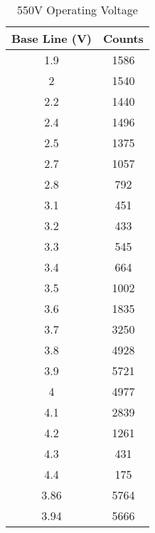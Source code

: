 \begin{table}[]
	\centering
	\begin{tabular}{|c|c|}
	\hline
	\textbf{Base Line (V)} & \textbf{Counts} \\ \hline
	1.9 & 1586 \\ \hline
	2 & 1540 \\ \hline
	2.2 & 1440 \\ \hline
	2.4 & 1496 \\ \hline
	2.5 & 1375 \\ \hline
	2.7 & 1057 \\ \hline
	2.8 & 792 \\ \hline
	3.1 & 451 \\ \hline
	3.2 & 433 \\ \hline
	3.3 & 545 \\ \hline
	3.4 & 664 \\ \hline
	3.5 & 1002 \\ \hline
	3.6 & 1835 \\ \hline
	3.7 & 3250 \\ \hline
	3.8 & 4928 \\ \hline
	3.9 & 5721 \\ \hline
	4 & 4977 \\ \hline
	4.1 & 2839 \\ \hline
	4.2 & 1261 \\ \hline
	4.3 & 431 \\ \hline
	4.4 & 175 \\ \hline
	3.86 & 5764 \\ \hline
	3.94 & 5666 \\ \hline
	\end{tabular}
	\caption{550V Operating Voltage}
	\label{tab:sca550}
\end{table}